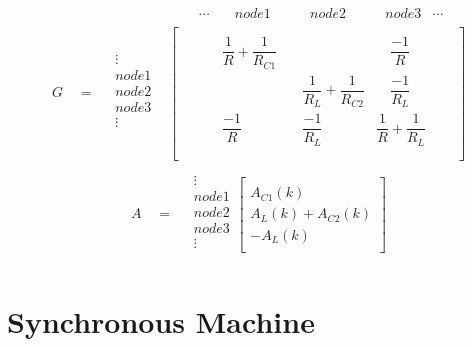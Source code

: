 \begin{align}
\begin{split}
&
\begin{matrix}
& \quad \cdots & \quad node1 \quad & \quad node2 \quad &  \quad node3 & \cdots
\end{matrix}\\[-6pt]
G \quad = \quad
\begin{matrix}
\vdots\\[8pt]
node1\\[8pt]
node2\\[8pt]
node3\\[8pt]
\vdots\\
\end{matrix}
&
\begin{bmatrix}
	\quad & \quad &  \\[8pt]
	\quad & \quad \dfrac{1}{R} + \dfrac{1}{R_{C1}} & \quad & \quad \dfrac{-1}{R} & \quad  \\[8pt]
	\quad & \quad & \quad \dfrac{1}{R_L} + \dfrac{1}{R_{C2}} & \quad \dfrac{-1}{R_L} & \quad \\[8pt]
	\quad & \quad \dfrac{-1}{R} & \quad \dfrac{-1}{R_L} & \dfrac{1}{R}+\dfrac{1}{R_L} & \quad\\[8pt]
	\quad\\ 
\end{bmatrix}
\end{split}
\end{align}
\begin{align}
\begin{split}
A\quad = \quad
\begin{matrix}
\vdots\\[8pt]
node1\\[8pt]
node2\\[8pt]
node3\\[8pt]
\vdots\\
\end{matrix}
\begin{bmatrix}
	\quad \\[8pt]
	A_{C1}(k) \\[8pt]
	A_L(k) + A_{C2}(k) \\[8pt]
	-A_L(k) \\[8pt]
	\quad
\end{bmatrix}
\end{split}
\end{align}
 
\section{Synchronous Machine}


